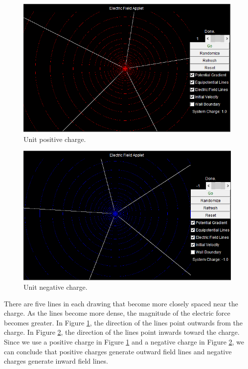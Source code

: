 \documentclass[oneside,12pt]{amsart}
\begin{document}
     	\paragraph{}
	
		\begin{figure}[H]
		\includegraphics[width=\medgraph,scale=0.01]{Pos.png}
		\caption{Unit positive charge.} 
		\label{Pos}
	\end{figure}

	\begin{figure}[H]
	\includegraphics[width=\medgraph,scale=0.01]{Neg.png}
	\caption{Unit negative charge.} 
	\label{Neg}
	\end{figure}
There are five lines in each drawing that become more closely spaced near the charge. As the lines become more dense, the magnitude of the electric force becomes greater. In Figure \ref{Pos}, the direction of the lines point outwards from the charge. In Figure \ref{Neg}, the direction of the lines point inwards toward the charge. Since we use a positive charge in Figure \ref{Pos} and a negative charge in Figure \ref{Neg}, we can conclude that positive charges generate outward field lines and negative charges generate inward field lines.
\end{document}
